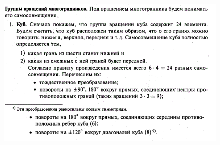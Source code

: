 \documentclass[12pt, oneside]{book}
\theoremstyle{definition}
\begin{document}
\begin{enumerate}
\begin{figure}[h!]
\end{figure}\\
\begin{figure}[h!]
\centering
\includegraphics[scale=1.1]{4-7.PNG}
\end{figure}\\



\end{enumerate}
\end{document}
